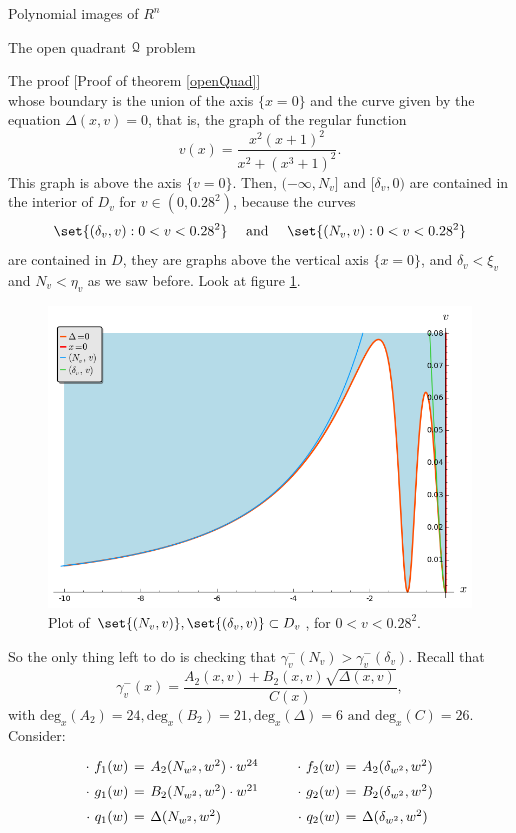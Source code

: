 \documentclass[11pt, a4paper, english, twoside, notitlepage, openright]{report}
\begin{document}
\begin{chapter}{Polynomial images of $R^n$}
\begin{section}{The open quadrant $\mathcal{Q}$ problem}
\begin{subsection}{The proof} [Proof of theorem \ref{openQuad}]
$$$$ 
whose boundary is the union of the axis $\{x=0\}$ and the curve given by the equation $\Delta(x,v)=0$, that is, the graph of the regular function
$$
v(x)=\frac{x^2(x+1)^2}{x^2+(x^3+1)^2}.
$$
This graph is above the axis $\{v=0\}$. Then, $(-\infty,N_v]$ and $[\delta_v,0)$ are contained in the interior of $D_v$ for $v\in (0, 0.28^2)$, because the curves 
$$
\set{(\delta_v,v):0<v<0.28^2} \quad\text{ and }\quad \set{(N_v,v):0<v<0.28^2}
$$ 
are contained in $D$, they are graphs above the vertical axis $\{x=0\}$, and $\delta_v<\xi_v$ and $N_v<\eta_v$ as we saw before. Look at figure \ref{fig:nice_plot}.

\begin{figure}[h]
\centering
\includegraphics[width=1\textwidth]{plots/ch1_15_nice_plot.png}
\caption{Plot of $\set{(N_v, v)}, \set{(\delta_v,v)}\subset D_v$, for $0<v<0.28^2$.\label{fig:nice_plot}}
\end{figure}
So the only thing left to do is checking that $\gamma_v^-(N_v)>\gamma_v^-(\delta_v)$. Recall that 
$$
\gamma_v^-(x)=\dfrac{A_2(x,v)+B_2(x,v)\sqrt{\Delta(x,v)}}{C(x)},
$$
with $\text{deg}_x(A_2)=24,\text{deg}_x(B_2)=21, \text{deg}_x(\Delta)=6 \text{ and }\text{deg}_x(C)=26$. Consider:
$$
\arraycolsep=2pt\def\arraystretch{1.5}
\begin{array}{rclcrcl}
\cdot\ f_1(w)&=&A_2(N_{w^2},w^2)\cdot w^{24}& \qquad &\cdot\ f_2(w)&=& A_2(\delta_{w^2},w^2)\\
\cdot\ g_1(w)&=&B_2(N_{w^2},w^2)\cdot w^{21}& \qquad &\cdot\ g_2(w)&=&B_2(\delta_{w^2},w^2)\\
\cdot\ q_1(w)&=&\Delta(N_{w^2},w^2)& \qquad &\cdot\ q_2(w)&=&\Delta(\delta_{w^2},w^2)\\

\end{array}$$
\end{subsection}
\end{section}
\end{chapter}
\end{document}
